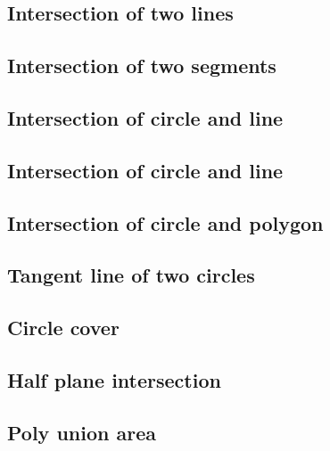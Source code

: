 \documentclass[a4paper,10pt,twocolumn,oneside]{article}
\begin{document}
\subsection{Intersection of two lines}


\subsection{Intersection of two segments}


\subsection{Intersection of circle and line}


\subsection{Intersection of circle and line}


\subsection{Intersection of circle and polygon}


\subsection{Tangent line of two circles}


\subsection{Circle cover}


\subsection{Half plane intersection}


\subsection{Poly union area}

\end{document}
